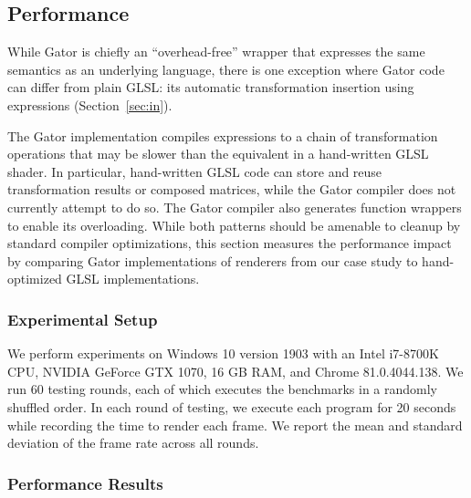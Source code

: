 {\subsection{Performance}
\label{sec:performance}

While Gator is chiefly an ``overhead-free'' wrapper that expresses the same semantics as an underlying language,
there is one exception where Gator code can differ from plain GLSL:
its automatic transformation insertion using  expressions (Section~\ref{sec:in}).

The Gator implementation compiles  expressions to a chain of transformation operations that may be slower than the equivalent in a hand-written GLSL shader.
In particular, hand-written GLSL code can store and reuse transformation results or composed matrices, while the Gator compiler does not currently attempt to do so.
The Gator compiler also generates function wrappers to enable its overloading.
While both patterns should be amenable to cleanup by standard compiler optimizations,
this section measures the performance impact by comparing Gator implementations of renderers from our case study to hand-optimized GLSL implementations.

\subsubsection{Experimental Setup}

We perform experiments on Windows 10 version 1903 with an Intel i7-8700K CPU, NVIDIA GeForce GTX 1070, 16 GB RAM, and Chrome 81.0.4044.138.
We run 60 testing rounds, each of which executes the benchmarks in a randomly shuffled order.
In each round of testing, we execute each program for 20 seconds while recording the time to render each frame.
We report the mean and standard deviation of the frame rate across all rounds.

\subsubsection{Performance Results}

}
